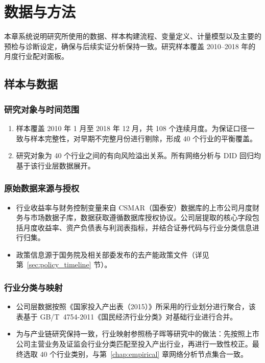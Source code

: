 \chapter{数据与方法}
\label{chapter:data_method}

本章系统说明研究所使用的数据、样本构建流程、变量定义、计量模型以及主要的预检与诊断设定，确保与后续实证分析保持一致。研究样本覆盖 2010--2018 年的月度行业配对面板。

\section{样本与数据}
\label{sec:data_source}

\subsection{研究对象与时间范围}
\begin{enumerate}
    \item 样本覆盖 2010 年 1 月至 2018 年 12 月，共 108 个连续月度。为保证口径一致与样本完整性，对早期不完整月份进行剔除，形成 40 个行业的平衡覆盖。
    \item 研究对象为 40 个行业之间的有向风险溢出关系。所有网络分析与 DID 回归均基于该行业层数据展开。
\end{enumerate}

\subsection{原始数据来源与授权}
\begin{itemize}
    \item 行业收益率与财务控制变量来自 CSMAR（国泰安）数据库的上市公司月度财务与市场数据子库，数据获取遵循数据库授权协议。公司层提取的核心字段包括月度收益率、资产负债表与利润表指标，并结合证券代码与行业分类信息进行归集。
    \item 政策信息源于国务院及相关部委发布的去产能政策文件（详见第~\ref{sec:policy_timeline} 节）。
\end{itemize}

\subsection{行业分类与映射}
\begin{itemize}
    \item 公司层数据按照《国家投入产出表（2015）》所采用的行业划分进行聚合，该表基于 GB/T~4754-2011《国民经济行业分类》对基础行业进行合并。
    \item 为与产业链研究保持一致，行业映射参照杨子晖等研究中的做法：先按照上市公司主营业务及证监会行业分类匹配至投入产出行业，再进行一致性校正。最终选取 40 个行业类别，与第~\ref{chap:empirical} 章网络分析节点集合一致。
\end{itemize}

